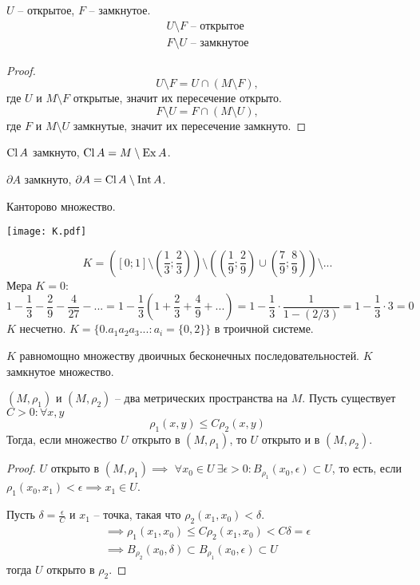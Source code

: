 \documentclass[main]{subfiles}
\begin{document}
\begin{proposition}
    $U$ -- открытое, $F$ -- замкнутое.
    \begin{gather*}
        U \setminus F \text{ -- открытое}\\
        F \setminus U \text{ -- замкнутое}
    \end{gather*}
\end{proposition}
\begin{proof}
    \[U \setminus F = U \cap (M \setminus F),\]
    где $U$ и $M \setminus F$ открытые, значит их пересечение открыто.
    \[F \setminus U = F \cap (M \setminus U),\]
    где $F$ и $M \setminus U$ замкнутые, значит их пересечение замкнуто.
\end{proof}
\begin{corollary}
    $\operatorname{Cl} A$ замкнуто, $\operatorname{Cl} A = M \setminus \operatorname{Ex} A$.

    $\partial A$ замкнуто, $\partial A = \operatorname{Cl} A \setminus \operatorname{Int} A$.
\end{corollary}

\begin{example}
    Канторово множество.

    \begin{center}
        \texttt{[image: K.pdf]}
    \end{center}

    \[K = \left( \left[0;1\right]
        \setminus \left(\frac{1}{3}; \frac{2}{3}\right) \right)
        \setminus \left( \left(\frac{1}{9}; \frac{2}{9}\right)
        \cup \left(\frac{7}{9}; \frac{8}{9}\right) \right)
        \setminus ...\]
    Мера $K = 0$:
    \[1 - \frac{1}{3} - \frac{2}{9} - \frac{4}{27} - ... =
        1 - \frac{1}{3} \left(1 + \frac{2}{3} + \frac{4}{9} + ...\right) =
        1 - \frac{1}{3} \cdot \frac{1}{1- (2/3)} =
        1 - \frac{1}{3} \cdot 3 = 0\]
    $K$ несчетно. $K = \{0.a_1 a_2 a_3 ...: a_i = \{0, 2\}\}$ в троичной системе.

    $K$ равномощно множеству двоичных бесконечных последовательностей.
    $K$ замкнутое множество.
\end{example}

\begin{theorem}
    $(M, \rho_1)$ и $(M, \rho_2)$ -- два метрических пространства на $M$.
    Пусть существует $C > 0: \forall x,y$
    \[\rho_1 (x,y) \le C \rho_2(x,y)\]
    Тогда, если множество $U$ открыто в $(M, \rho_1)$,
    то $U$ открыто и в $(M, \rho_2)$.
\end{theorem}
\begin{proof}
    $U$ открыто в $(M, \rho_1) \implies$
    $\forall x_0 \in U \ \exists \epsilon > 0: B_{\rho_1} (x_0, \epsilon) \subset U$,
    то есть, если $\rho_1 (x_0, x_1) < \epsilon \implies x_1 \in U$.

    Пусть $\delta = \frac{\epsilon}{C}$ и $x_1$ -- точка, такая что $\rho_2 (x_1, x_0) < \delta$.
    \begin{gather*}
        \implies \rho_1 (x_1, x_0) \le C \rho_2 (x_1, x_0) < C\delta = \epsilon\\
        \implies B_{\rho_2}(x_0, \delta) \subset B_{\rho_1}(x_0, \epsilon) \subset U
    \end{gather*}
    тогда $U$ открыто в $\rho_2$.
\end{proof}
\end{document}
